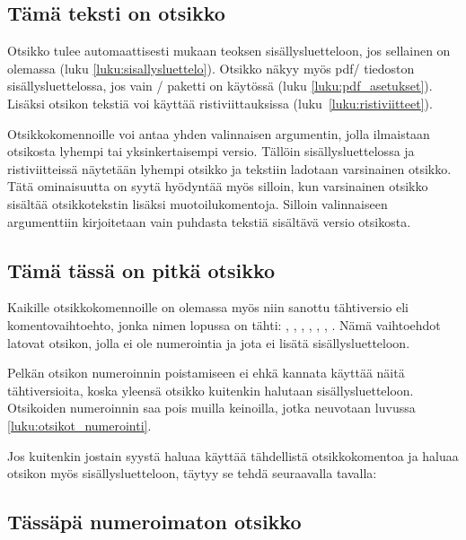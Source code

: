\begin{koodilohkosis}
\section{Tämä teksti on otsikko}
\end{koodilohkosis}

Otsikko tulee automaattisesti mukaan teoksen sisällysluetteloon, jos
sellainen on olemassa (luku \ref{luku:sisallysluettelo}). Otsikko näkyy
myös pdf\-/ tiedoston sisällysluettelossa, jos vain
\-/ paketti on käytössä (luku
\ref{luku:pdf_asetukset}). Lisäksi otsikon tekstiä voi käyttää
ristiviittauksissa (luku~\ref{luku:ristiviitteet}).

Otsikkokomennoille voi antaa yhden valinnaisen argumentin, jolla
ilmaistaan otsikosta lyhempi tai yksinkertaisempi versio. Tällöin
sisällysluettelossa ja ristiviitteissä näytetään lyhempi otsikko ja
tekstiin ladotaan varsinainen otsikko. Tätä ominaisuutta on syytä
hyödyntää myös silloin, kun varsinainen otsikko sisältää otsikkotekstin
lisäksi muotoilukomentoja. Silloin valinnaiseen argumenttiin
kirjoitetaan vain puhdasta tekstiä sisältävä versio otsikosta.

\begin{koodilohkosis}
\section[Lyhyt otsikko]{Tämä tässä on pitkä otsikko}
\end{koodilohkosis}

Kaikille otsikkokomennoille on olemassa myös niin sanottu tähtiversio
eli komentovaihtoehto, jonka nimen lopussa on tähti: ,
, , ,
, , .
Nämä vaihtoehdot latovat otsikon, jolla ei ole numerointia ja jota ei
lisätä sisällysluetteloon.

Pelkän otsikon numeroinnin poistamiseen ei ehkä kannata käyttää näitä
tähtiversioita, koska yleensä otsikko kuitenkin halutaan
sisällysluetteloon. Otsikoiden numeroinnin saa pois muilla keinoilla,
jotka neuvotaan luvussa \ref{luku:otsikot_numerointi}.

Jos kuitenkin jostain syystä haluaa käyttää tähdellistä otsikkokomentoa
ja haluaa otsikon myös sisällysluetteloon, täytyy se tehdä seuraavalla
tavalla:

\begin{koodilohkosis}
\section*{Tässäpä numeroimaton otsikko}
{}
\end{koodilohkosis}

